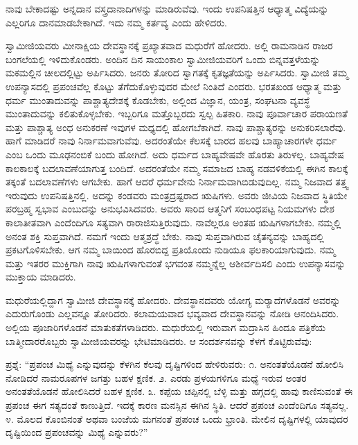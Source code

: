  ನಾವು ಬೇಕಾದಷ್ಟು ಅನ್ನದಾನ ವಸ್ತ್ರದಾನಾದಿಗಳನ್ನು ಮಾಡಿರುವೆವು. ಇಂದು ಉಪನಿಷತ್ತಿನ ಆಧ್ಯಾತ್ಮ ವಿದ್ಯೆಯನ್ನು ಎಲ್ಲರಿಗೂ ದಾನಮಾಡಬೇಕಾಗಿದೆ. ಇದು ನಮ್ಮ ಕರ್ತವ್ಯ ಎಂದು ಹೇಳಿದರು. 

 ಸ್ವಾಮೀಜಿಯವರು ಮೀನಾಕ್ಷಿಯ ದೇವಸ್ಥಾನಕ್ಕೆ ಪ್ರಖ್ಯಾತವಾದ ಮಧುರೆಗೆ ಹೋದರು. ಅಲ್ಲಿ ರಾಮನಾಡಿನ ರಾಜರ ಬಂಗಲೆಯಲ್ಲಿ ಇಳಿದುಕೊಂಡರು. ಅಂದಿನ ದಿನ ಸಾಯಂಕಾಲ ಸ್ವಾಮೀಜಿಯವರಿಗೆ ಒಂದು ಬಿನ್ನವತ್ತಳೆಯನ್ನು ಮಕಮಲ್ಲಿನ ಚೀಲದಲ್ಲಿಟ್ಟು ಅರ್ಪಿಸಿದರು. ಜನರು ತೋರಿದ ಸ್ವಾಗತಕ್ಕೆ ಕೃತಜ್ಞತೆಯನ್ನು ಅರ್ಪಿಸಿದರು. ಸ್ವಾಮೀಜಿ ತಮ್ಮ ಉಪನ್ಯಾಸದಲ್ಲಿ ಪ್ರಪಂಚವೆಲ್ಲ ಕೊಟ್ಟು ತೆಗೆದುಕೊಳ್ಳುವುದರ ಮೇಲೆ ನಿಂತಿದೆ ಎಂದರು. ಭರತಖಂಡ ಆಧ್ಯಾತ್ಮ ಮತ್ತು ಧರ್ಮ ಮುಂತಾದುವನ್ನು ಪಾಶ್ಚಾತ್ಯದೇಶಕ್ಕೆ ಕೊಡಬೇಕು, ಅಲ್ಲಿಂದ ವಿಜ್ಞಾನ, ಯಂತ್ರ, ಸಂಘಟನಾ ವ್ಯವಸ್ಥೆ ಮುಂತಾದುವನ್ನು ಕಲಿತುಕೊಳ್ಳಬೇಕು. ಇಬ್ಬರಿಗೂ ಮತ್ತೊಬ್ಬರದು ಸ್ವಲ್ಪ ಹಿತಕಾರಿ. ನಾವು ಪೂರ್ವಾಚಾರ ಪರಾಯಣತೆ ಮತ್ತು ಪಾಶ್ಚಾತ್ಯ ಅಂಧ ಅನುಕರಣೆ ಇವುಗಳ ಮಧ್ಯದಲ್ಲಿ ಹೋಗಬೆಕಾಗಿದೆ. ನಾವು ಪಾಶ್ಚಾತ್ಯರನ್ನು ಅನುಕರಿಸಲಾರೆವು. ಹಾಗೆ ಮಾಡಿದರೆ ನಾವು ನಿರ್ನಾಮವಾಗುವೆವು. ಅದರಂತೆಯೇ ಕೆಲಸಕ್ಕೆ ಬಾರದ ಹಲವು ಬಾಹ್ಯಾಚಾರಗಳೇ ಧರ್ಮ ಎಂಬ ಒಂದು ಮೂಢನಂಬಿಕೆ ಬಂದು ಹೋಗಿದೆ. ಅದು ಧರ್ಮದ ಬಾಹ್ಯವೇಷವೇ ಹೊರತು ತಿರುಳಲ್ಲ. ಬಾಹ್ಯವೇಷ ಕಾಲಕಾಲಕ್ಕೆ ಬದಲಾವಣೆಯಾಗುತ್ತ ಬಂದಿದೆ. ಅದರಂತೆಯೇ ನಮ್ಮ ಸಮಾಜದ ಬಾಹ್ಯ ನಡವಳಿಕೆಯಲ್ಲಿ ಈಗಿನ ಕಾಲಕ್ಕೆ ತಕ್ಕಂತೆ ಬದಲಾವಣೆಗಳು ಆಗಬೇಕು. ಹಾಗೆ ಆದರೆ ಧರ್ಮವೇನು ನಿರ್ನಾಮವಾಗಿಬಿಡುವುದಿಲ್ಲ. ನಮ್ಮ ನಿಜವಾದ ತತ್ತ್ವ ಇರುವುದು ಉಪನಿಷತ್ತಿನಲ್ಲಿ. ಅದನ್ನು ಕಂಡವರು ಮಂತ್ರದ್ರಷ್ಟರಾದ ಋಷಿಗಳು. ಅವರು ಜೀವಿಯ ನಿಜವಾದ ಸ್ಥಿತಿಯೇ ಪರಬ್ರಹ್ಮ ಸ್ವಭಾವ ಎಂಬುದನ್ನು ಅನುಭವಿಸಿದವರು. ಅವರು ಸಾರಿದ ಆತ್ಮನಿಗೆ ಸಂಬಂಧಪಟ್ಟ ನಿಯಮಗಳು ದೇಶ ಕಾಲಾತೀತವಾಗಿ ಎಂದೆಂದಿಗೂ ಸತ್ಯವಾಗಿ ರಾರಾಜಿಸುತ್ತಿರುವುದು. ನಾವೆಲ್ಲರೂ ಅಂತಹ ಋಷಿಗಳಾಗಬೇಕು. ನಮ್ಮಲ್ಲಿ ಅನಂತ ಶಕ್ತಿ ಸುಪ್ತವಾಗಿದೆ. ನಮಗೆ ಇಂದು ಆತ್ಮಶ್ರದ್ಧೆ ಬೇಕು. ನಾವು ಸುಪ್ತವಾಗಿರುವ ಚೈತನ್ಯವನ್ನು ಬಾಹ್ಯದಲ್ಲಿ ಪ್ರಕಟಗೊಳಿಸಬೇಕು. ಆಗ ನಮ್ಮ ಬಾಯಿಂದ ಹೊರಬಿದ್ದ ಪ್ರತಿಯೊಂದು ನುಡಿಯೂ ಫಲಕಾರಿಯಾಗುವುದು. ನಮ್ಮ ಮತ್ತು ಇತರರ ಮುಕ್ತಿಗಾಗಿ ನಾವು ಋಷಿಗಳಾಗುವಂತೆ ಭಗವಂತ ನಮ್ಮನ್ನೆಲ್ಲ ಆಶೀರ್ವದಿಸಲಿ ಎಂದು ಉಪನ್ಯಾಸವನ್ನು ಮುಕ್ತಾಯ ಮಾಡಿದರು. 

 ಮಧುರೆಯಲ್ಲಿದ್ದಾಗ ಸ್ವಾಮೀಜಿ ದೇವಸ್ಥಾನಕ್ಕೆ ಹೋದರು. ದೇವಸ್ಥಾನದವರು ಯೋಗ್ಯ ಮರ‍್ಯಾದೆಗಳೊಡನೆ ಅವರನ್ನು ಎದುರುಗೊಂಡು ಎಲ್ಲವನ್ನೂ ತೋರಿದರು. ಕಲಾಮಯವಾದ ಭವ್ಯವಾದ ದೇವಸ್ಥಾನವನ್ನು ನೋಡಿ ಆನಂದಿಸಿದರು. ಅಲ್ಲಿಯ ಪೂಜಾರಿಗಳೊಡನೆ ಮಾತುಕತೆಗಳಾಡಿದರು. ಮಧುರೆಯಲ್ಲಿ ಇರುವಾಗ ಮದ್ರಾಸಿನ ಹಿಂದೂ ಪತ್ರಿಕೆಯ ಬಾತ್ಮೀದಾರರೊಬ್ಬರು ಸ್ವಾಮೀಜಿಯವರನ್ನು ಭೇಟಿಮಾಡಿದರು. ಆ ಸಂದರ್ಶನವನ್ನು ಕೆಳಗೆ ಕೊಟ್ಟಿರುವೆವು: 

 ಪ್ರಶ್ನೆ: “ಪ್ರಪಂಚ ಮಿಥ್ಯೆ ಎನ್ನುವುದನ್ನು ಕೆಳಗಿನ ಕೆಲವು ದೃಷ್ಟಿಗಳಿಂದ ಹೇಳಿರುವರು: ೧. ಅನಂತತೆಯೊಡನೆ ಹೋಲಿಸಿ ನೋಡಿದರೆ ನಾಮರೂಪಗಳ ಜಗತ್ತು ಬಹಳ ಕ್ಷಣಿಕ. ೨. ಎರಡು ಪ್ರಳಯಗಳಿಗೂ ಮಧ್ಯೆ ಇರುವ ಅಂತರ ಅನಂತತೆಯೊಡನೆ ಹೋಲಿಸಿದರೆ ಬಹಳ ಕ್ಷಣಿಕ. ೩. ಕಪ್ಪೆಯ ಚಪ್ಪಿನಲ್ಲಿ ಬೆಳ್ಳಿ ಮತ್ತು ಹಗ್ಗದಲ್ಲಿ ಹಾವು ಕಾಣಿಸುವಂತೆ ಈ ಪ್ರಪಂಚ ಈಗ ಸತ್ಯದಂತೆ ಕಾಣುತ್ತಿದೆ. ಇದಕ್ಕೆ ಕಾರಣ ಮನಸ್ಸಿನ ಈಗಿನ ಸ್ಥಿತಿ. ಆದರೆ ಪ್ರಪಂಚ ಎಂದೆಂದಿಗೂ ಸತ್ಯವಲ್ಲ. ೪. ಮೊಲದ ಕೊಂಬಿನಂತೆ ಅಥವಾ ಬಂಜೆಯ ಮಗನಂತೆ ಪ್ರಪಂಚ ಒಂದು ಭ್ರಾಂತಿ. ಮೇಲಿನ ದೃಷ್ಟಿಗಳಲ್ಲಿ ಯಾವುದರ ದೃಷ್ಟಿಯಿಂದ ಪ್ರಪಂಚವನ್ನು ಮಿಥ್ಯೆ ಎನ್ನುವರು?” 

